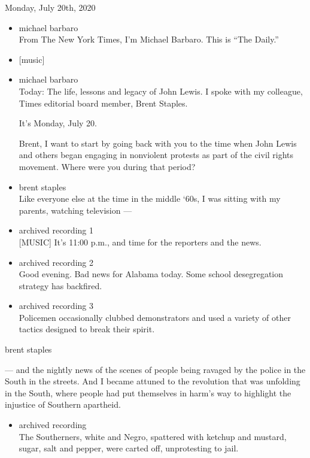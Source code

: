 Monday, July 20th, 2020

\begin{itemize}
\item
  michael barbaro\\
  From The New York Times, I'm Michael Barbaro. This is ``The Daily.''
\item
  {[}music{]}
\item
  michael barbaro\\
  Today: The life, lessons and legacy of John Lewis. I spoke with my
  colleague, Times editorial board member, Brent Staples.

  It's Monday, July 20.

  Brent, I want to start by going back with you to the time when John
  Lewis and others began engaging in nonviolent protests as part of the
  civil rights movement. Where were you during that period?
\item
  brent staples\\
  Like everyone else at the time in the middle `60s, I was sitting with
  my parents, watching television ---
\item
  archived recording 1\\
  {[}MUSIC{]} It's 11:00 p.m., and time for the reporters and the news.
\item
  archived recording 2\\
  Good evening. Bad news for Alabama today. Some school desegregation
  strategy has backfired.
\item
  archived recording 3\\
  Policemen occasionally clubbed demonstrators and used a variety of
  other tactics designed to break their spirit.
\end{itemize}

brent staples

--- and the nightly news of the scenes of people being ravaged by the
police in the South in the streets. And I became attuned to the
revolution that was unfolding in the South, where people had put
themselves in harm's way to highlight the injustice of Southern
apartheid.

\begin{itemize}
\tightlist
\item
  archived recording\\
  The Southerners, white and Negro, spattered with ketchup and mustard,
  sugar, salt and pepper, were carted off, unprotesting to jail.
\end{itemize}

